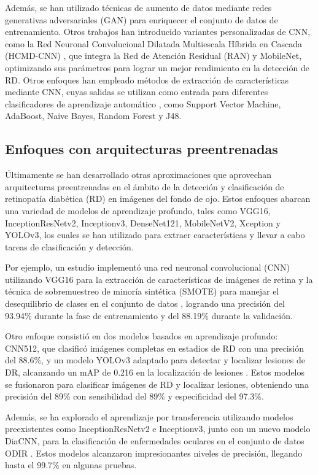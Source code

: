 Además, se han utilizado técnicas de aumento de datos mediante redes generativas adversariales (GAN) para enriquecer el conjunto de datos de entrenamiento. Otros trabajos han introducido variantes personalizadas de CNN, como la Red Neuronal Convolucional Dilatada Multiescala Híbrida en Cascada (HCMD-CNN) , que integra la Red de Atención Residual (RAN) y MobileNet, optimizando sus parámetros para lograr un mejor rendimiento en la detección de RD. Otros enfoques han empleado métodos de extracción de características mediante CNN, cuyas salidas se utilizan como entrada para diferentes clasificadores de aprendizaje automático  , como Support Vector Machine, AdaBoost, Naive Bayes, Random Forest y J48.

\subsection{Enfoques con arquitecturas preentrenadas}

Últimamente se han desarrollado otras aproximaciones que aprovechan arquitecturas preentrenadas en el ámbito de la detección y clasificación de retinopatía diabética (RD) en imágenes del fondo de ojo. Estos enfoques abarcan una variedad de modelos de aprendizaje profundo, tales como VGG16, InceptionResNetv2, Inceptionv3, DenseNet121, MobileNetV2, Xception y YOLOv3, los cuales se han utilizado para extraer características y llevar a cabo tareas de clasificación y detección.

Por ejemplo, un estudio implementó una red neuronal convolucional (CNN) utilizando VGG16 para la extracción de características de imágenes de retina y la técnica de sobremuestreo de minoría sintética (SMOTE) para manejar el desequilibrio de clases en el conjunto de datos , logrando una precisión del 93.94\% durante la fase de entrenamiento y del 88.19\% durante la validación.

Otro enfoque consistió en dos modelos basados en aprendizaje profundo: CNN512, que clasificó imágenes completas en estadios de RD con una precisión del 88.6\%, y un modelo YOLOv3 adaptado para detectar y localizar lesiones de DR, alcanzando un mAP de 0.216 en la localización de lesiones . Estos modelos se fusionaron para clasificar imágenes de RD y localizar lesiones, obteniendo una precisión del 89\% con sensibilidad del 89\% y especificidad del 97.3\%.

Además, se ha explorado el aprendizaje por transferencia utilizando modelos preexistentes como InceptionResNetv2 e Inceptionv3, junto con un nuevo modelo DiaCNN, para la clasificación de enfermedades oculares en el conjunto de datos ODIR . Estos modelos alcanzaron impresionantes niveles de precisión, llegando hasta el 99.7\% en algunas pruebas.


